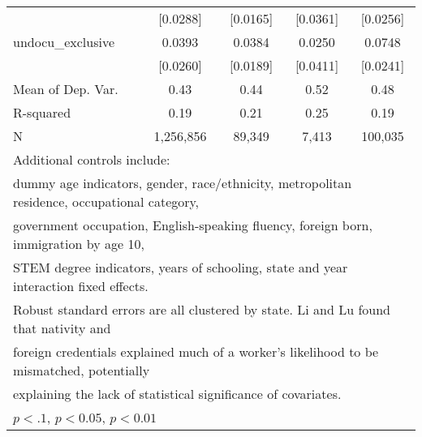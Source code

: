 \begin{table}[htbp]
\begin{tabular}{l*{4}{c}}
                    &    [0.0288]         &    [0.0165]         &    [0.0361]         &    [0.0256]         \\
\addlinespace
undocu\_exclusive    &      0.0393         &      0.0384\sym{**} &      0.0250         &      0.0748\sym{***}\\
                    &    [0.0260]         &    [0.0189]         &    [0.0411]         &    [0.0241]         \\
\midrule
Mean of Dep. Var.   &        0.43         &        0.44         &        0.52         &        0.48         \\
R-squared           &        0.19         &        0.21         &        0.25         &        0.19         \\
N                   &   1,256,856         &      89,349         &       7,413         &     100,035         \\
\bottomrule
\multicolumn{5}{l}{\footnotesize Additional controls include:}\\
\multicolumn{5}{l}{\footnotesize dummy age indicators, gender, race/ethnicity, metropolitan residence, occupational category,}\\
\multicolumn{5}{l}{\footnotesize government occupation, English-speaking fluency, foreign born, immigration by age 10,}\\
\multicolumn{5}{l}{\footnotesize STEM degree indicators, years of schooling, state and year interaction fixed effects.}\\
\multicolumn{5}{l}{\footnotesize Robust standard errors are all clustered by state. Li and Lu found that nativity and}\\
\multicolumn{5}{l}{\footnotesize foreign credentials explained much of a worker's likelihood to be mismatched, potentially}\\
\multicolumn{5}{l}{\footnotesize explaining the lack of statistical significance of covariates.}\\
\multicolumn{5}{l}{\footnotesize \sym{*} \(p<.1\), \sym{**} \(p<0.05\), \sym{***} \(p<0.01\)}\\
\end{tabular}
\end{table}
